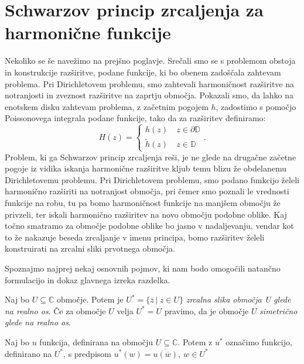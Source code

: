 \documentclass[mat1]{fmfdelo}
\begin{document}
\section{Schwarzov princip zrcaljenja za harmonične funkcije}
    Nekoliko se še navežimo na prejšno poglavje. 
    Srečali smo se s problemom obstoja in konstrukcije razširitve, podane funkcije, ki bo obenem zadoščala zahtevam problema.  
    Pri Dirichletovem problemu, smo zahtevali harmoničnost razširitve na notranjosti in zveznost razširitve na zaprtju območja. 
    Pokazali smo, da lahko na enotskem disku zahtevam problema, z začetnim pogojem $h$, zadostimo s pomočjo Poissonovega integrala podane funkcije, tako da za razširitev definiramo:
    $$
        H(z) = 
        \begin{cases}
            h(z)~&z \in \partial \mathbb{D} \\
            \widetilde{h}(z)~&z \in \mathbb{D}
        \end{cases}.
    $$
    Problem, ki ga Schwarzov princip zrcaljenja reši, je ne glede na drugačne začetne pogoje iz vidika iskanja harmonične razširitve kljub temu blizu že obdelanemu Dirichletovemu problemu.
    Pri Dirichletovem problemu, smo podano funkcijo želeli harmonično razširiti na notranjost območja, pri čemer smo poznali le vrednosti funkcije na robu, tu pa bomo harmoničnost funkcije na manjšem območju že privzeli, ter iskali harmonično razširitev na novo območju podobne oblike.
    Kaj točno smatramo za območje podobne oblike bo jasno v nadaljevanju, vendar kot to že nakazuje beseda zrcaljanje v imenu principa, bomo razširitev želeli konstruirati na zrcalni sliki prvotnega območja. 
    
    Spoznajmo najprej nekaj osnovnih pojmov, ki nam bodo omogočili natančno formulacijo in dokaz glavnega izreka razdelka.
    \begin{definicija}
        Naj bo $U \subseteq \mathbb{C}$ območje. Potem je $U^* = \{\overline{z}~|~z \in U\}$ \emph{zrcalna slika območja U glede na realno os}.
        Če za območje $U$ velja $U^* = U$ pravimo, da je območje $U$ \emph{simetrično glede na realno os}.
    \end{definicija}

    \begin{definicija}
        Naj bo $u$ funkcija, definirana na območju $U \subseteq \mathbb{C}$. Potem z \emph{$u^*$} označimo funkcijo, definirano na $U^*$, s predpisom $u^*(w) = \overline{u(\overline{w})},~w \in U^*$
    \end{definicija}
\end{document}
